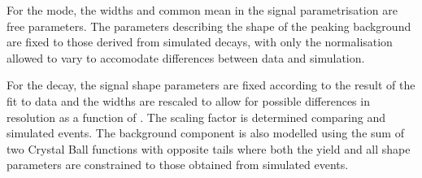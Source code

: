  For the \decay{\Lb}{\jpsi\Lz} mode, the widths and common mean in the
 signal parametrisation are free parameters. The parameters describing
 the shape of the peaking background are fixed to those derived from
 simulated \decay{\Bz}{\jpsi\KS} decays, with only the normalisation
 allowed to vary to accomodate differences between data and simulation.

 For the \decay{\Lb}{\Lz\mumu} decay, the signal shape parameters are
 fixed according to the result of the fit to \decay{\Lb}{\jpsi\Lz}
 data and the widths are rescaled to allow for possible differences
 in resolution as a function of \qsq. The scaling factor is determined
 comparing \decay{\Lb}{\jpsi\Lz} and \decay{\Lb}{\Lz\mumu} simulated events.
 The \decay{\Bz}{\KS\mumu} background component is also
 modelled using the sum of two Crystal Ball functions with opposite
 tails where both the yield and all shape parameters are constrained
 to those obtained from simulated events.
 
